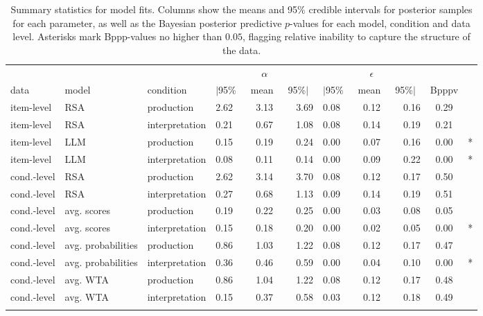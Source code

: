 \documentclass[fleqn]{article}
\begin{document}
\begin{table}[t]
\centering
\begin{tabular}{llllcrlcrcl}
  \toprule
  &&&& $\alpha$ &&& $\epsilon$ & \\ \cmidrule(r){4-6} \cmidrule(l){7-9}
  data & model & condition & $|$95\%\ & mean\ & 95\%$|$\ & $|$95\%\ & mean\ & 95\%$|$\ & Bpppv & \\
  \midrule

  item-level  & RSA                & production     & 2.62 & 3.13 & 3.69 & 0.08 & 0.12 & 0.16 & 0.29 &  \\
  item-level  & RSA                & interpretation & 0.21 & 0.67 & 1.08 & 0.08 & 0.14 & 0.19 & 0.21 &  \\
  item-level  & LLM                & production     & 0.15 & 0.19 & 0.24 & 0.00 & 0.07 & 0.16 & 0.00 & * \\
  item-level  & LLM                & interpretation & 0.08 & 0.11 & 0.14 & 0.00 & 0.09 & 0.22 & 0.00 & * \\
  cond.-level & RSA                & production     & 2.62 & 3.14 & 3.70 & 0.08 & 0.12 & 0.17 & 0.50 &  \\
  cond.-level & RSA                & interpretation & 0.27 & 0.68 & 1.13 & 0.09 & 0.14 & 0.19 & 0.51 &  \\
  cond.-level & avg. scores        & production     & 0.19 & 0.22 & 0.25 & 0.00 & 0.03 & 0.08 & 0.05 &  \\
  cond.-level & avg. scores        & interpretation & 0.15 & 0.18 & 0.20 & 0.00 & 0.02 & 0.05 & 0.00 & * \\
  cond.-level & avg. probabilities & production     & 0.86 & 1.03 & 1.22 & 0.08 & 0.12 & 0.17 & 0.47 &  \\
  cond.-level & avg. probabilities & interpretation & 0.36 & 0.46 & 0.59 & 0.00 & 0.04 & 0.10 & 0.00 & * \\
  cond.-level & avg. WTA           & production     & 0.86 & 1.04 & 1.22 & 0.08 & 0.12 & 0.17 & 0.48 &  \\
  cond.-level & avg. WTA           & interpretation & 0.15 & 0.37 & 0.58 & 0.03 & 0.12 & 0.18 & 0.49 &  \\

   \bottomrule \\
\end{tabular}
\caption{
  Summary statistics for model fits.
  Columns show the means and 95\% credible intervals for posterior samples for each parameter, as well as the Bayesian posterior predictive $p$-values for each model, condition and data level.
  Asterisks mark Bppp-values no higher than $0.05$, flagging relative inability to capture the structure of the data.
}
\label{tab:sumStats}
\end{table}
\end{document}
